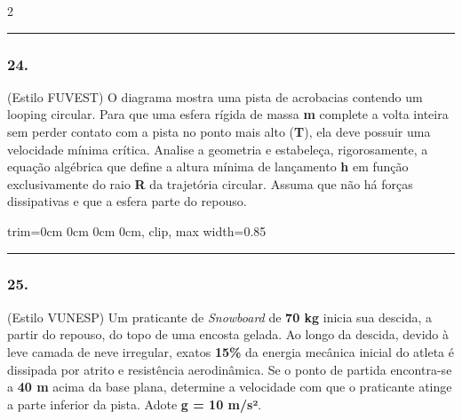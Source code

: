 \documentclass[twoside, 10pt, a4paper]{article}
\newlength{\espacoPreQuestao}\setlength{\espacoPreQuestao}{0.1cm}
\newlength{\espacoQuestao}\setlength{\espacoQuestao}{0.2cm}
\newcommand{\larguraTikz}{0.85\linewidth}
\begin{document}
\begin{multicols*}{2}
\noindent\textcolor{CorLinha}{\rule{\linewidth}{0.5pt}} 
\par\vspace{\espacoPreQuestao}
\subsubsection*{24.} (Estilo FUVEST) O diagrama mostra uma pista de acrobacias contendo um looping circular. Para que uma esfera rígida de massa \textbf{m} complete a volta inteira sem perder contato com a pista no ponto mais alto (\textbf{T}), ela deve possuir uma velocidade mínima crítica. Analise a geometria e estabeleça, rigorosamente, a equação algébrica que define a altura mínima de lançamento \textbf{h} em função exclusivamente do raio \textbf{R} da trajetória circular. Assuma que não há forças dissipativas e que a esfera parte do repouso.
\begin{center}
\begin{adjustbox}{trim=0cm 0cm 0cm 0cm, clip, max width=\larguraTikz}
\end{adjustbox}
\end{center}
\par\vspace{\espacoQuestao}

\noindent\textcolor{CorLinha}{\rule{\linewidth}{0.5pt}} 
\par\vspace{\espacoPreQuestao}
\subsubsection*{25.} (Estilo VUNESP) Um praticante de \textit{Snowboard} de \textbf{70 kg} inicia sua descida, a partir do repouso, do topo de uma encosta gelada. Ao longo da descida, devido à leve camada de neve irregular, exatos \textbf{15\%} da energia mecânica inicial do atleta é dissipada por atrito e resistência aerodinâmica. Se o ponto de partida encontra-se a \textbf{40 m} acima da base plana, determine a velocidade com que o praticante atinge a parte inferior da pista. Adote \textbf{g = 10 m/s²}.
\par\vspace{\espacoQuestao}


\end{multicols*}
\end{document}
